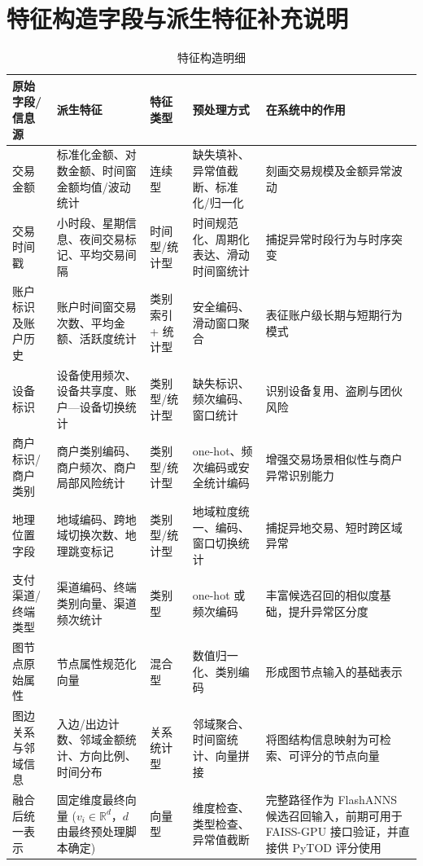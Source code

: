 \Needspace{0.78\textheight}
\section{特征构造字段与派生特征补充说明}

\begin{table}[!htbp]
  \caption{特征构造明细}
  \label{tab:feature-engineering}
  \centering
  \small
  \renewcommand{\arraystretch}{1.2}
  \begin{adjustbox}{max width=\linewidth}
  \begin{tabular}{P{2.8cm}P{4.1cm}P{2.4cm}P{3.2cm}P{4.3cm}}
    \toprule
    原始字段/信息源 & 派生特征 & 特征类型 & 预处理方式 & 在系统中的作用\\
    \midrule
    交易金额 & 标准化金额、对数金额、时间窗金额均值/波动统计 & 连续型 & 缺失填补、异常值截断、标准化/归一化 & 刻画交易规模及金额异常波动\\
    交易时间戳 & 小时段、星期信息、夜间交易标记、平均交易间隔 & 时间型/统计型 & 时间规范化、周期化表达、滑动时间窗统计 & 捕捉异常时段行为与时序突变\\
    账户标识及账户历史 & 账户时间窗交易次数、平均金额、活跃度统计 & 类别索引 + 统计型 & 安全编码、滑动窗口聚合 & 表征账户级长期与短期行为模式\\
    设备标识 & 设备使用频次、设备共享度、账户---设备切换统计 & 类别型/统计型 & 缺失标识、频次编码、窗口统计 & 识别设备复用、盗刷与团伙风险\\
    商户标识/商户类别 & 商户类别编码、商户频次、商户局部风险统计 & 类别型/统计型 & one-hot、频次编码或安全统计编码 & 增强交易场景相似性与商户异常识别能力\\
    地理位置字段 & 地域编码、跨地域切换次数、地理跳变标记 & 类别型/统计型 & 地域粒度统一、编码、窗口切换统计 & 捕捉异地交易、短时跨区域异常\\
    支付渠道/终端类型 & 渠道编码、终端类别向量、渠道频次统计 & 类别型 & one-hot 或频次编码 & 丰富候选召回的相似度基础，提升异常区分度\\
    图节点原始属性 & 节点属性规范化向量 & 混合型 & 数值归一化、类别编码 & 形成图节点输入的基础表示\\
    图边关系与邻域信息 & 入边/出边计数、邻域金额统计、方向比例、时间分布 & 关系统计型 & 邻域聚合、时间窗统计、向量拼接 & 将图结构信息映射为可检索、可评分的节点向量\\
    融合后统一表示 & 固定维度最终向量 ($v_i\in\mathbb{R}^d$，$d$ 由最终预处理脚本确定) & 向量型 & 维度检查、类型检查、异常值截断 & 完整路径作为 FlashANNS 候选召回输入，前期可用于 FAISS-GPU 接口验证，并直接供 PyTOD 评分使用\\
    \bottomrule
  \end{tabular}
  \end{adjustbox}
\end{table}

